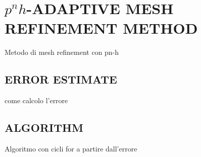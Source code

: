 \section*{$p^n h$-ADAPTIVE MESH REFINEMENT METHOD}

Metodo di mesh refinement con pn-h



\subsection*{ERROR ESTIMATE}

come calcolo l'errore
\subsection*{ALGORITHM}

Algoritmo con cicli for a partire dall'errore